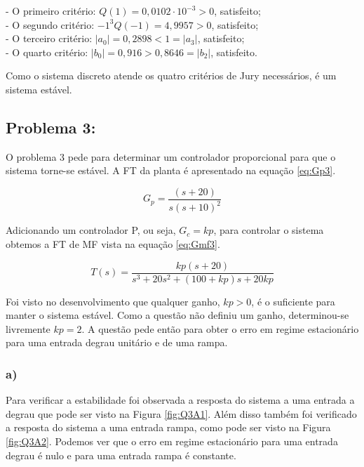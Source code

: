     - O primeiro critério: $Q(1)= 0,0102 \cdot 10^{-3} > 0$, satisfeito; \\
    - O segundo critério: $-1^3 Q(-1) = 4,9957 > 0$, satisfeito;\\
    - O terceiro critério: $|a_0| = 0,2898 < 1 = |a_3|$, satisfeito; \\
    - O quarto critério: $|b_0| = 0,916 > 0,8646 = |b_2| $, satisfeito. 
    
    Como o sistema discreto atende os quatro critérios de Jury necessários, é um sistema estável.

\newpage    
\subsection*{Problema 3:}

    O problema 3 pede para determinar um controlador proporcional para que o sistema torne-se estável. 
    A FT da planta é apresentado na equação \ref{eq:Gp3}.

    \begin{equation}
        G_p =  \frac{(s+20)}{s(s+10)^2}
        \label{eq:Gp3}
    \end{equation}

    Adicionando um controlador P, ou seja, $G_c = kp$, para controlar o sistema obtemos a FT de MF vista na equação
    \ref{eq:Gmf3}. 

    \begin{equation}
        T(s) = \frac{kp(s+20)}{s^3+20s^2+(100+kp)s+20kp}
        \label{eq:Gmf3}
    \end{equation}

    Foi visto no desenvolvimento que qualquer ganho, $kp > 0$, é o suficiente para manter o sistema
    estável. Como a questão não definiu um ganho, determinou-se livremente $kp = 2$.
    A questão pede então para obter o erro em regime estacionário para uma entrada degrau unitário
    e de uma rampa. 

\subsubsection*{a)}
    Para verificar a estabilidade foi observada a resposta do sistema a uma entrada a degrau que pode ser visto na Figura 
    \ref{fig:Q3A1}. Além disso também foi verificado a resposta do sistema a uma entrada rampa, como pode ser visto na Figura 
    \ref{fig:Q3A2}. Podemos ver que o erro em regime estacionário para uma entrada degrau é nulo e para uma entrada rampa é constante. 
    

